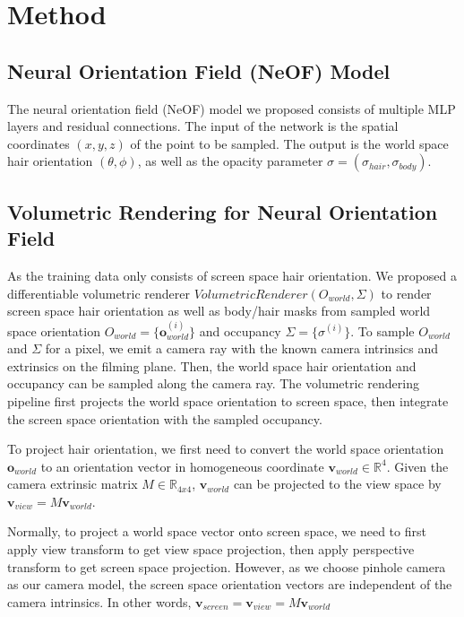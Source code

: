 \documentclass[12pt]{article}
\begin{document}
\section{Method}


\subsection{Neural Orientation Field (NeOF) Model}

The neural orientation field (NeOF) model we proposed consists of multiple MLP layers and residual connections. The input of the network is the spatial coordinates $(x, y, z)$ of the point to be sampled. The output is the world space hair orientation $(\theta, \phi)$, as well as the opacity parameter $\sigma = (\sigma_{hair}, \sigma_{body})$.

\subsection{Volumetric Rendering for Neural Orientation Field}

As the training data only consists of screen space hair orientation. We proposed a differentiable volumetric renderer $VolumetricRenderer(O_{world}, \Sigma)$ to render screen space hair orientation as well as body/hair masks from sampled world space orientation $O_{world} = \{ \mathbf{o}_{world}^{(i)} \}$ and occupancy $\Sigma = \{ \sigma^{(i)} \}$. To sample $O_{world}$ and $\Sigma$ for a pixel, we emit a camera ray with the known camera intrinsics and extrinsics on the filming plane. Then, the world space hair orientation and occupancy can be sampled along the camera ray. The volumetric rendering pipeline first projects the world space orientation to screen space, then integrate the screen space orientation with the sampled occupancy.

To project hair orientation, we first need to convert the world space orientation $\mathbf{o}_{world}$ to an orientation vector in homogeneous coordinate $\mathbf{v}_{world} \in \mathbb{R}^{4}$. Given the camera extrinsic matrix $M \in \mathbb{R}_{4x4}$, $\mathbf{v}_{world}$ can be projected to the view space by $\mathbf{v}_{view} = M\mathbf{v}_{world}$.

Normally, to project a world space vector onto screen space, we need to first apply view transform to get view space projection, then apply perspective transform to get screen space projection. However, as we choose pinhole camera as our camera model, the screen space orientation vectors are independent of the camera intrinsics. In other words, $\mathbf{v}_{screen} = \mathbf{v}_{view} = M\mathbf{v}_{world}$
\end{document}
